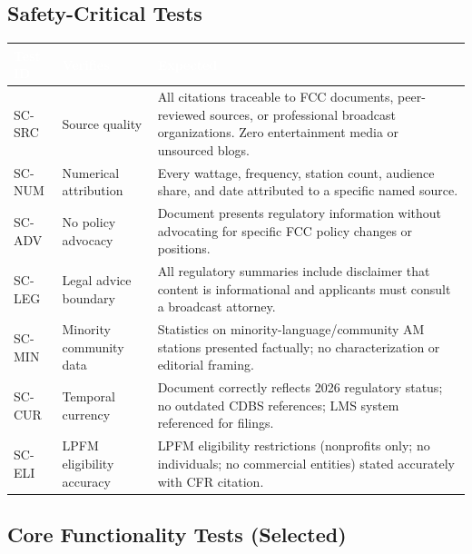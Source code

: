 \documentclass[11pt,letterpaper]{article}
\newcommand{\tableheader}[1]{\textbf{\sffamily\textcolor{white}{#1}}}
\begin{document}
\begin{asciibox}
\subsection{Safety-Critical Tests}

\begin{center}
\begin{tabularx}{\textwidth}{C{1.5cm}L{3.5cm}X}
\toprule
{}
\tableheader{Test ID} & \tableheader{Verifies} & \tableheader{Expected} \\
\midrule
SC-SRC & Source quality & All citations traceable to FCC documents, peer-reviewed sources, or professional broadcast organizations. Zero entertainment media or unsourced blogs. \\
SC-NUM & Numerical attribution & Every wattage, frequency, station count, audience share, and date attributed to a specific named source. \\
SC-ADV & No policy advocacy & Document presents regulatory information without advocating for specific FCC policy changes or positions. \\
SC-LEG & Legal advice boundary & All regulatory summaries include disclaimer that content is informational and applicants must consult a broadcast attorney. \\
SC-MIN & Minority community data & Statistics on minority-language/community AM stations presented factually; no characterization or editorial framing. \\
SC-CUR & Temporal currency & Document correctly reflects 2026 regulatory status; no outdated CDBS references; LMS system referenced for filings. \\
SC-ELI & LPFM eligibility accuracy & LPFM eligibility restrictions (nonprofits only; no individuals; no commercial entities) stated accurately with CFR citation. \\
\bottomrule
\end{tabularx}
\end{center}

\subsection{Core Functionality Tests (Selected)}


\end{asciibox}
\end{document}
